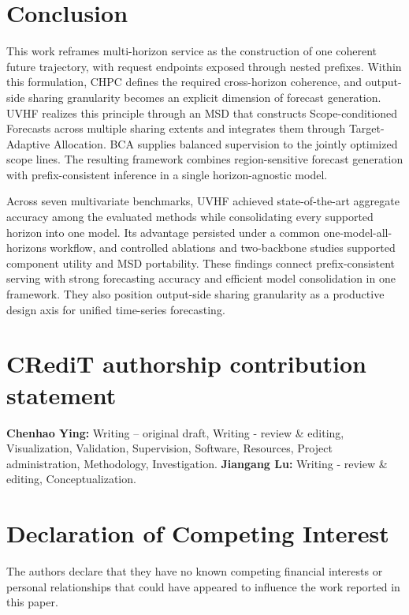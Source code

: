 \documentclass[final,3p,times]{elsarticle}
\begin{document}
\section{Conclusion}
\label{sec:conclusion}


This work reframes multi-horizon service as the construction of one coherent future trajectory, with request endpoints exposed through nested prefixes. Within this formulation, CHPC defines the required cross-horizon coherence, and output-side sharing granularity becomes an explicit dimension of forecast generation. UVHF realizes this principle through an MSD that constructs Scope-conditioned Forecasts across multiple sharing extents and integrates them through Target-Adaptive Allocation. BCA supplies balanced supervision to the jointly optimized scope lines. The resulting framework combines region-sensitive forecast generation with prefix-consistent inference in a single horizon-agnostic model.

Across seven multivariate benchmarks, UVHF achieved state-of-the-art aggregate accuracy among the evaluated methods while consolidating every supported horizon into one model. Its advantage persisted under a common one-model-all-horizons workflow, and controlled ablations and two-backbone studies supported component utility and MSD portability. These findings connect prefix-consistent serving with strong forecasting accuracy and efficient model consolidation in one framework. They also position output-side sharing granularity as a productive design axis for unified time-series forecasting.

\section*{CRediT authorship contribution statement}
\indent \textbf{Chenhao Ying:} Writing -- original draft, Writing - review \& editing, Visualization, Validation, Supervision, Software, Resources, Project administration, Methodology, Investigation. \textbf{Jiangang Lu:} Writing - review \& editing, Conceptualization.

\section*{Declaration of Competing Interest}
\indent The authors declare that they have no known competing financial interests or personal relationships that could have appeared to influence the work reported in this paper.
\end{document}
